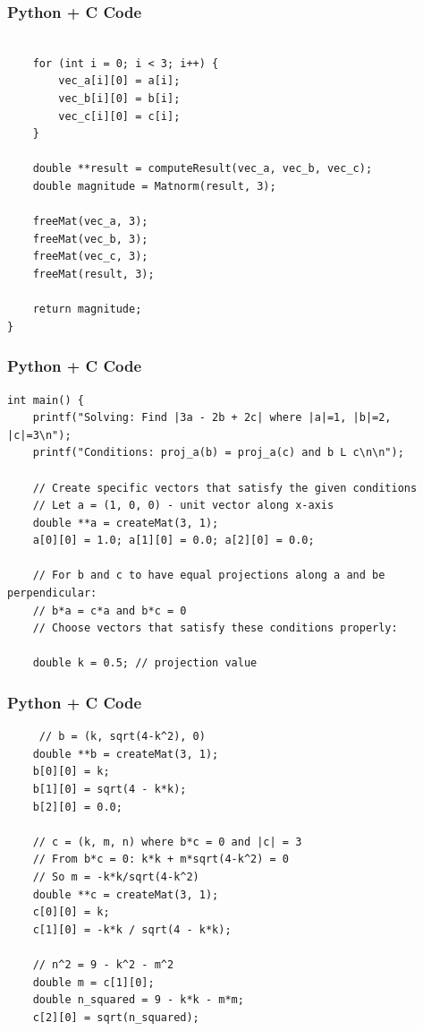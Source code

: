 \documentclass{beamer}
\begin{document}
\begin{frame}[fragile]
    \frametitle{Python + C Code}
    \begin{lstlisting}
       
    for (int i = 0; i < 3; i++) {
        vec_a[i][0] = a[i];
        vec_b[i][0] = b[i];
        vec_c[i][0] = c[i];
    }
    
    double **result = computeResult(vec_a, vec_b, vec_c);
    double magnitude = Matnorm(result, 3);
    
    freeMat(vec_a, 3);
    freeMat(vec_b, 3);
    freeMat(vec_c, 3);
    freeMat(result, 3);
    
    return magnitude;
}
\end{lstlisting}
\end{frame}

\begin{frame}[fragile]
    \frametitle{Python + C Code}
    \begin{lstlisting}
int main() {
    printf("Solving: Find |3a - 2b + 2c| where |a|=1, |b|=2, |c|=3\n");
    printf("Conditions: proj_a(b) = proj_a(c) and b L c\n\n");
    
    // Create specific vectors that satisfy the given conditions
    // Let a = (1, 0, 0) - unit vector along x-axis
    double **a = createMat(3, 1);
    a[0][0] = 1.0; a[1][0] = 0.0; a[2][0] = 0.0;
    
    // For b and c to have equal projections along a and be perpendicular:
    // b*a = c*a and b*c = 0
    // Choose vectors that satisfy these conditions properly:
    
    double k = 0.5; // projection value
    \end{lstlisting}
\end{frame}

\begin{frame}[fragile]
    \frametitle{Python + C Code}
    \begin{lstlisting}
     // b = (k, sqrt(4-k^2), 0)
    double **b = createMat(3, 1);
    b[0][0] = k;
    b[1][0] = sqrt(4 - k*k);
    b[2][0] = 0.0;
    
    // c = (k, m, n) where b*c = 0 and |c| = 3
    // From b*c = 0: k*k + m*sqrt(4-k^2) = 0
    // So m = -k*k/sqrt(4-k^2)
    double **c = createMat(3, 1);
    c[0][0] = k;
    c[1][0] = -k*k / sqrt(4 - k*k);
    
    // n^2 = 9 - k^2 - m^2
    double m = c[1][0];
    double n_squared = 9 - k*k - m*m;
    c[2][0] = sqrt(n_squared);
    \end{lstlisting}
\end{frame}
\end{document}
